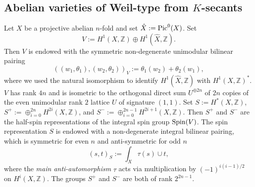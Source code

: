 \documentclass[12pt]{amsart}
\numberwithin{equation}{subsection}
\theoremstyle{plain}
\theoremstyle{definition}
\newcommand{\ZZ}{{\mathbb Z}}
\newcommand{\Integers}{{\mathbb Z}}
\newcommand{\Spin}{{\rm Spin}}
\newcommand{\Pic}{{\rm Pic}}
\begin{document}
\subsection{Abelian varieties of Weil-type from $K$-secants}
\label{sec-abelian-varieties-of-Weil-type-introduction}
Let $X$ be a projective abelian $n$-fold and set $\hat{X}:=\Pic^0(X)$. 
Set 
\begin{equation}
\label{eq-V}
V:=H^1(X,\Integers)\oplus H^1(\hat{X},\Integers). 
\end{equation}
Then $V$ is endowed with the symmetric non-degenerate unimodular bilinear pairing 
\begin{equation}
\label{eq-pairing-on-V}
((w_1,\theta_1),(w_2,\theta_2))_V:=\theta_1(w_2)+\theta_2(w_1),
\end{equation}
where we used the natural isomorphism to identify $H^1(\hat{X},\Integers)$ with $H^1(X,\Integers)^*$.
$V$ has rank $4n$ and is isometric to the orthogonal direct sum $U^{\oplus 2n}$ of $2n$ copies of the even unimodular rank $2$ lattice $U$ of signature $(1,1)$. 
Set $S:=H^*(X,\Integers)$, $S^+:=\oplus_{i=0}^{2n} H^{2i}(X,\Integers)$, and $S^-:=\oplus_{i=0}^{2n-1} H^{2i+1}(X,\Integers)$. Then $S^+$ and $S^-$ are the half-spin representations of the integral spin group $\Spin(V)$.
The spin representation $S$ is endowed with a non-degenerate integral bilinear pairing, which is symmetric for even $n$ and anti-symmetric for odd $n$
\begin{equation}
\label{eq-Mukai-pairing}
(s,t)_S:=\int_X\tau(s)\cup t,
\end{equation}
where the {\em main anti-automorphism} $\tau$ acts via multiplication by $(-1)^{i(i-1)/2}$ on $H^i(X,\ZZ)$.
The groups $S^+$ and $S^-$ are both of rank $2^{2n-1}$.
\end{document}
